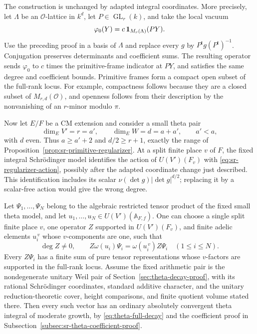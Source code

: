 The construction is unchanged by adapted integral coordinates.  More
precisely, let \(\Lambda\) be an \(\mathcal O\)-lattice in \(k^d\), let
\(P\in\operatorname{GL}_r(k)\), and take the local vacuum
\[
 \varphi_0(Y)=c\,{\bf1}_{M_r(\Lambda)}(PY).
\]
Use the preceding proof in a basis of \(\Lambda\) and replace every
\(g\) by \(P^{\mathsf t}g(P^{\mathsf t})^{-1}\).  Conjugation preserves
determinants and coefficient sums.  The resulting operator sends
\(\varphi_0\) to \(c\) times the primitive-frame indicator at \(PY\),
and satisfies the same degree and coefficient bounds.  Primitive
frames form a compact open subset of the full-rank locus.  For example,
compactness follows because they are a closed subset of
\(M_{r,d}(\mathcal O)\), and openness follows from their description by
the nonvanishing of an \(r\)-minor modulo \(\pi\).

Now let \(E/F\) be a CM extension and consider a small theta pair
\[
 \dim_E V'=r=a',\qquad \dim_E W=d=a+a',\qquad a'<a,
\]
with \(d\) even.  Thus \(a\ge a'+2\) and \(d/2\ge r+1\), exactly the
range of Proposition~\ref{prop:sr-primitive-regularizer}.  At a split
finite place \(v\) of \(F\), the fixed integral Schr\"odinger model
identifies the action of \(U(V')(F_v)\) with
\eqref{eq:sr-regularizer-action}, possibly after the adapted coordinate
change just described.  This identification includes its scalar
\(\nu(\det g)|\det g|^{d/2}\); replacing it by a scalar-free action would
give the wrong degree.

\begin{srproposition}
\label{prop:sr-simultaneous-regularizer}
Let \(\Psi_1,\ldots,\Psi_N\) belong to the algebraic restricted tensor
product of the fixed small theta model, and let
\(u_1,\ldots,u_N\in U(V')(\mathbb A_{F,f})\).
One can choose a single split finite place \(v\), one operator \(Z\)
supported in \(U(V')(F_v)\), and finite adelic elements \(u_i^{\,v}\)
whose \(v\)-components are one, such that
\[
 \deg Z\ne0,\qquad
 Z\omega(u_i)\Psi_i=\omega(u_i^{\,v})Z\Psi_i\quad(1\le i\le N).
\]
Every \(Z\Psi_i\) has a finite sum of pure tensor representations whose
\(v\)-factors are supported in the full-rank locus.  Assume the fixed arithmetic pair is the nondegenerate unitary Weil
pair of Section~\ref{sec:theta-decay-proof}, with its rational
Schr\"odinger coordinates, standard additive character, and the
unitary reduction-theoretic cover, height comparisons, and finite
quotient volume stated there.  Then every such vector has an ordinary
absolutely convergent theta integral of moderate growth, by
\eqref{eq:theta-full-decay} and the coefficient proof in
Subsection~\ref{subsec:sr-theta-coefficient-proof}.
\end{srproposition}

